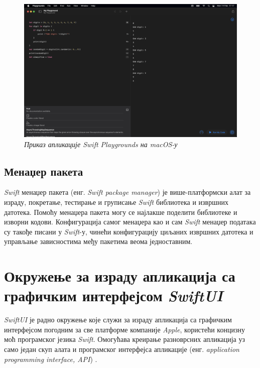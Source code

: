 \documentclass[12pt,oneside]{memoir}
\begin{document}
\begin{figure}[H]
\includegraphics[width=1\textwidth]{images/Swift_Playground_macOS.png}
\centering
\caption{\textit{Приказ апликације Swift Playgrounds на macOS-у}}
\label{slika:swift_playground_macos}
\end{figure}

\subsection{Менаџер пакета}

\indent \textit{Swift} менаџер пакета (енг. \textit{Swift package manager}) је више-платформски алат за израду, покретање, тестирање и груписање \textit{Swift} библиотека и извршних датотека. Помоћу менаџера пакета могу се најлакше поделити библиотеке и изворни кодови. Конфигурација самог менаџера као и сам \textit{Swift} менаџер података су такође писани у \textit{Swift}-у, чинећи конфигурацију циљаних извршних датотека и управљање зависностима међу пакетима веома једноставним.

\section{Окружење за израду апликација са графичким интерфејсом \textit{SwiftUI}}
\label{sec:SwiftUI}

\indent \textit{SwiftUI} је радно окружење које служи за израду апликација са графичким интерфејсом погодним за све платформе компаније \textit{Apple}, користећи концизну моћ програмског језика \textit{Swift}. Омогућава креирање разноврсних апликација уз само један скуп алата и програмског интерфејса апликације (енг. \textit{application programming interface, API}) \cite{SwiftUI_Cookbook}.
\end{document}
